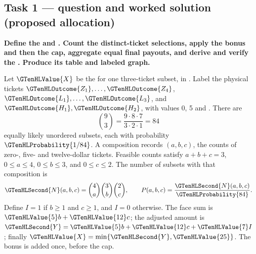 \subsection*{Task 1 --- question and worked solution (proposed allocation) }
\label{sol:q6t1}

\noindent\textbf{\boldmath Define the  and . Count the distinct-ticket selections, apply the bonus and then the cap, aggregate equal final payouts, and derive and verify the . Produce its table and labeled graph.}\par\nopagebreak

Let $\GTenHLValue{X}$ be the  for one three-ticket subset, in . Label the physical tickets $\GTenHLOutcome{Z_1},\ldots,\GTenHLOutcome{Z_4}$, $\GTenHLOutcome{L_1},\ldots,\GTenHLOutcome{L_3}$, and $\GTenHLOutcome{H_1},\GTenHLOutcome{H_2}$, with values 0, 5 and . There are
\[
\binom{9}{3}=\frac{9\cdot8\cdot7}{3\cdot2\cdot1}=84
\]
equally likely unordered subsets, each with probability $\GTenHLProbability{1/84}$. A composition records $(a,b,c)$, the counts of zero-, five- and twelve-dollar tickets. Feasible counts satisfy $a+b+c=3$, $0\leq a\leq4$, $0\leq b\leq3$, and $0\leq c\leq2$. The number of subsets with that composition is
\[
\GTenHLSecond{N}(a,b,c)=\binom{4}{a}\binom{3}{b}\binom{2}{c},\qquad P(a,b,c)=\frac{\GTenHLSecond{N}(a,b,c)}{\GTenHLProbability{84}}.
\]
Define $I=1$ if $b\geq1$ and $c\geq1$, and $I=0$ otherwise. The face sum is $\GTenHLValue{5}b+\GTenHLValue{12}c$; the adjusted amount is $\GTenHLSecond{Y}=\GTenHLValue{5}b+\GTenHLValue{12}c+\GTenHLValue{7}I$; finally $\GTenHLValue{X}=\min\{\GTenHLSecond{Y},\GTenHLValue{25}\}$. The bonus is added once, before the cap.

\begingroup\renewcommand{\arraystretch}{1.35}

